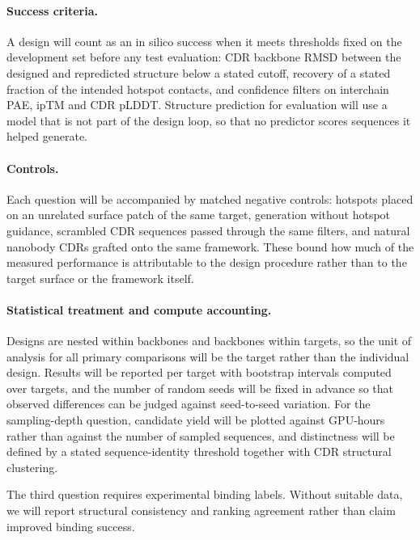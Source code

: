 \paragraph{Success criteria.} A design will count as an in silico success when it
meets thresholds fixed on the development set before any test evaluation: CDR
backbone RMSD between the designed and repredicted structure below a stated
cutoff, recovery of a stated fraction of the intended hotspot contacts, and
confidence filters on interchain PAE, ipTM and CDR pLDDT. Structure prediction
for evaluation will use a model that is not part of the design loop, so that no
predictor scores sequences it helped generate.

\paragraph{Controls.} Each question will be accompanied by matched negative
controls: hotspots placed on an unrelated surface patch of the same target,
generation without hotspot guidance, scrambled CDR sequences passed through the
same filters, and natural nanobody CDRs grafted onto the same framework. These
bound how much of the measured performance is attributable to the design
procedure rather than to the target surface or the framework itself.

\paragraph{Statistical treatment and compute accounting.} Designs are nested
within backbones and backbones within targets, so the unit of analysis for all
primary comparisons will be the target rather than the individual design.
Results will be reported per target with bootstrap intervals computed over
targets, and the number of random seeds will be fixed in advance so that
observed differences can be judged against seed-to-seed variation. For the
sampling-depth question, candidate yield will be plotted against GPU-hours
rather than against the number of sampled sequences, and distinctness will be
defined by a stated sequence-identity threshold together with CDR structural
clustering.

\noindent The third question requires experimental binding labels. Without suitable data, we will report structural consistency and ranking agreement rather than claim improved binding success.
